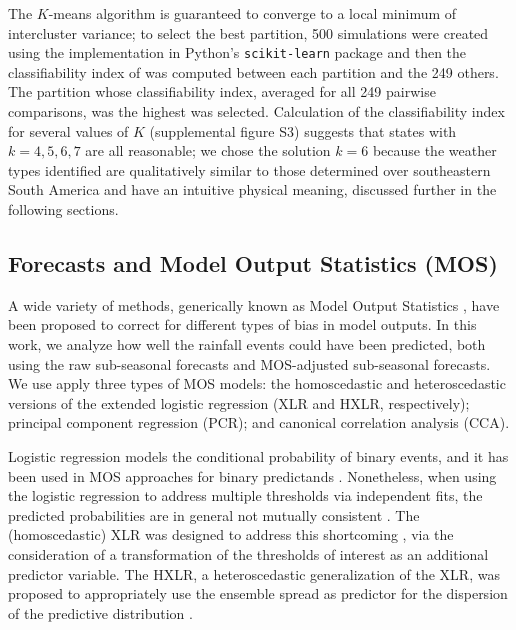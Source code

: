 \documentclass[twocol]{ametsoc}
\begin{document}
The $K$-means algorithm is guaranteed to converge to a local minimum of intercluster variance; to select the best partition, 500 simulations were created using the implementation in Python's \texttt{scikit-learn} package \citep{Pedregosa:2012tv} and then the classifiability index of \citet{Michelangeli1995} was computed between each partition and the 249 others.
The partition whose classifiability index, averaged for all 249 pairwise comparisons, was the highest was selected.
Calculation of the classifiability index for several values of $K$ (supplemental figure S3) suggests that states with $k=4,5,6,7$ are all reasonable; we chose the solution $k=6$ because the weather types identified are qualitatively similar to those determined over southeastern South America \citep{Munoz2015,Munoz2016} and have an intuitive physical meaning, discussed further in the following sections.

\subsection{Forecasts and Model Output Statistics (MOS)}

A wide variety of methods, generically known as Model Output Statistics \citep[MOS;][]{Glahn:1972vt}, have been proposed to correct for different types of bias in model outputs.
In this work, we analyze how well the rainfall events could have been predicted, both using the raw sub-seasonal forecasts and  MOS-adjusted sub-seasonal forecasts.
We use apply three types of MOS models: the homoscedastic and heteroscedastic versions of the extended logistic regression (XLR and HXLR, respectively); principal component regression (PCR); and canonical correlation analysis (CCA).

Logistic regression models the conditional probability of binary events, and it has been used in MOS approaches for binary predictands \citep{Hamill:2004hk}.
Nonetheless, when using the logistic regression to address multiple thresholds via independent fits, the predicted probabilities are in general not mutually consistent \citep{Messner:2014gp}.
The (homoscedastic) XLR was designed to address this shortcoming \citep{Wilks:2009bk}, via the consideration of a transformation of the thresholds of interest as an additional predictor variable.
The HXLR, a heteroscedastic generalization of the XLR, was proposed to appropriately use the ensemble spread as predictor for the dispersion of the predictive distribution \citep{Messner:2014gp}.
\end{document}
